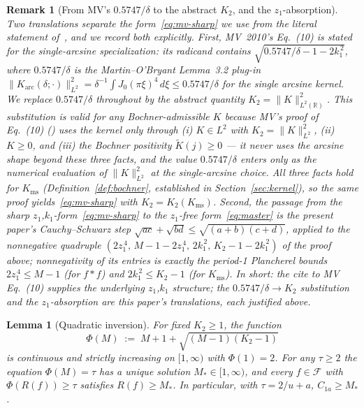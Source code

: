 \documentclass[11pt, letterpaper]{article}
\theoremstyle{paperplain}
\newtheorem{lemma}[theorem]{Lemma}
\theoremstyle{paperdef}
\newtheorem{remark}[theorem]{Remark}
\newcommand{\R}{\mathbb{R}}
\newcommand{\Karc}{K_{\mathrm{arc}}}
\newcommand{\Kms}{K_{\mathrm{ms}}}
\begin{document}
\begin{remark}[From MV's $0.5747/\delta$ to the abstract $K_2$, and the $z_1$-absorption]
\label{rem:mv-eq10-translation}
Two translations separate the form~\eqref{eq:mv-sharp} we use from the
literal statement of~\cite[Lemma~3.3, Eq.~(10)]{MV10}, and we record
both explicitly.  First, MV~2010's Eq.~(10) is stated for the
\emph{single-arcsine} specialization: its radicand contains
$\sqrt{0.5747/\delta-1-2k_1^{\,2}}$, where $0.5747/\delta$ is the
Martin--O'Bryant Lemma~3.2 plug-in
$\|\Karc(\delta;\cdot)\|_{L^2}^{2}=\delta^{-1}\int J_0(\pi\xi)^{4}\,d\xi
\le 0.5747/\delta$ for the single arcsine kernel.  We replace
$0.5747/\delta$ throughout by the abstract quantity
$K_2=\|K\|_{L^2(\R)}^{2}$.  This substitution is valid for any
Bochner-admissible $K$ because MV's proof of Eq.~(10)
(\cite[\S 3, proof of Lemma~3.3]{MV10}) uses the kernel only through
(i) $K\in L^2$ with $K_2=\|K\|_{L^2}^{2}$, (ii) $K\ge 0$, and (iii)
the Bochner positivity $\widetilde{K}(j)\ge 0$ --- it never uses the
arcsine shape beyond these three facts, and the value $0.5747/\delta$
enters only as the numerical evaluation of $\|K\|_{L^2}^{2}$ at the
single-arcsine choice.  All three facts hold for $\Kms$
(Definition~\ref{def:bochner}, established in
Section~\ref{sec:kernel}), so the same proof yields~\eqref{eq:mv-sharp}
with $K_2=K_2(\Kms)$.  Second, the passage from the sharp
$z_1$,$k_1$-form~\eqref{eq:mv-sharp} to the $z_1$-free
form~\eqref{eq:master} is the present paper's Cauchy--Schwarz step
$\sqrt{ac}+\sqrt{bd}\le\sqrt{(a+b)(c+d)}$, applied to the nonnegative
quadruple $(2z_1^{\,4},\,M-1-2z_1^{\,4},\,2k_1^{\,2},\,K_2-1-2k_1^{\,2})$
of the proof above; nonnegativity of its entries is exactly the
period-1 Plancherel bounds $2z_1^{\,4}\le M-1$ (for $f*f$) and
$2k_1^{\,2}\le K_2-1$ (for $\Kms$).  In short: the cite to MV Eq.~(10)
supplies the underlying $z_1$,$k_1$ structure; the $0.5747/\delta\to
K_2$ substitution and the $z_1$-absorption are this paper's
translations, each justified above.
\end{remark}

\begin{lemma}[Quadratic inversion]
\label{lem:inversion}
For fixed $K_2\ge 1$, the function
\[
  \Phi(M)\;:=\;M+1+\sqrt{(M-1)(K_2-1)}
\]
is continuous and strictly increasing on $[1,\infty)$ with
$\Phi(1)=2$.  For any $\tau\ge 2$ the equation $\Phi(M)=\tau$ has a
unique solution $M_*\in[1,\infty)$, and every $f\in\mathcal{F}$ with
$\Phi(R(f))\ge\tau$ satisfies $R(f)\ge M_*$.  In particular, with
$\tau=2/u+a$, $C_{1a}\ge M_*$.
\end{lemma}
\end{document}
